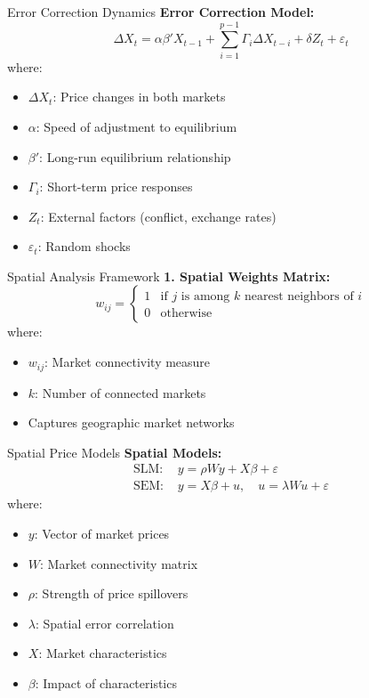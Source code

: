 \documentclass{beamer}
\begin{document}
\begin{frame}{Error Correction Dynamics}
    \textbf{Error Correction Model:}
    \begin{equation*}
    \Delta X_t = \alpha \beta' X_{t-1} + \sum_{i=1}^{p-1} \Gamma_i \Delta X_{t-i} + \delta Z_t + \varepsilon_t
    \end{equation*}
    where:
    \begin{itemize}
        \item $\Delta X_t$: Price changes in both markets
        \item $\alpha$: Speed of adjustment to equilibrium
        \item $\beta'$: Long-run equilibrium relationship
        \item $\Gamma_i$: Short-term price responses
        \item $Z_t$: External factors (conflict, exchange rates)
        \item $\varepsilon_t$: Random shocks
    \end{itemize}
\end{frame}

\begin{frame}{Spatial Analysis Framework}
    \textbf{1. Spatial Weights Matrix:}
    \begin{equation*}
    w_{ij} = \begin{cases}
    1 & \text{if } j \text{ is among } k \text{ nearest neighbors of } i \\
    0 & \text{otherwise}
    \end{cases}
    \end{equation*}
    where:
    \begin{itemize}
        \item $w_{ij}$: Market connectivity measure
        \item $k$: Number of connected markets
        \item Captures geographic market networks
    \end{itemize}
\end{frame}

\begin{frame}{Spatial Price Models}
    \textbf{Spatial Models:}
    \begin{align*}
    \text{SLM: } & y = \rho W y + X \beta + \varepsilon \\
    \text{SEM: } & y = X \beta + u, \quad u = \lambda W u + \varepsilon
    \end{align*}
    where:
    \begin{itemize}
        \item $y$: Vector of market prices
        \item $W$: Market connectivity matrix
        \item $\rho$: Strength of price spillovers
        \item $\lambda$: Spatial error correlation
        \item $X$: Market characteristics
        \item $\beta$: Impact of characteristics
    \end{itemize}
\end{frame}
\end{document}
